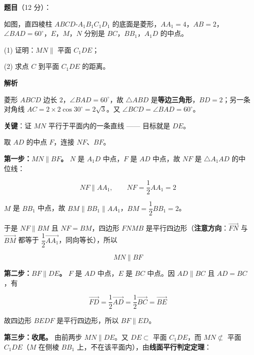 \begin{answer}

\textbf{题目}（12 分）：

如图，直四棱柱 $ABCD\text{-}A_1B_1C_1D_1$ 的底面是菱形，$AA_1=4$，$AB=2$，$\angle BAD=60^\circ$，$E$，$M$，$N$ 分别是 $BC$，$BB_1$，$A_1D$ 的中点。
\nopagebreak[4]
\begin{center}\end{center}
\nopagebreak[4]
  (1) 证明：$MN\parallel$ 平面 $C_1DE$；

  (2) 求点 $C$ 到平面 $C_1DE$ 的距离。

\textbf{解析}


菱形 $ABCD$ 边长 $2$，$\angle BAD=60^\circ$，故 $\triangle ABD$ 是\textbf{等边三角形}，$BD=2$；另一条对角线 $AC=2\times2\cos30^\circ=2\sqrt3$。又 $\angle BCD=\angle BAD=60^\circ$。


\textbf{关键}：证 $MN$ 平行于平面内的一条直线 —— 目标就是 $DE$。

取 $AD$ 的中点 $F$，连接 $NF$、$BF$。

\textbf{第一步：$MN\parallel BF$。}
$N$ 是 $A_1D$ 中点，$F$ 是 $AD$ 中点，故 $NF$ 是 $\triangle A_1AD$ 的中位线：

\nopagebreak[4]
\[NF\parallel AA_1,\qquad NF=\frac12AA_1=2\]

$M$ 是 $BB_1$ 中点，故 $BM\parallel BB_1\parallel AA_1$，$BM=\dfrac12BB_1=2$。

于是 $NF\parallel BM$ 且 $NF=BM$，四边形 $FNMB$ 是平行四边形（\textbf{注意方向}：$\overrightarrow{FN}$ 与 $\overrightarrow{BM}$ 都等于 $\dfrac12\overrightarrow{AA_1}$，同向等长），所以

\nopagebreak[4]
\[MN\parallel BF\]

\textbf{第二步：$BF\parallel DE$。}
$F$ 是 $AD$ 中点，$E$ 是 $BC$ 中点。因 $AD\parallel BC$ 且 $AD=BC$，有

\nopagebreak[4]
\[\overrightarrow{FD}=\frac12\overrightarrow{AD}=\frac12\overrightarrow{BC}=\overrightarrow{BE}\]

故四边形 $BEDF$ 是平行四边形，所以 $BF\parallel ED$。

\textbf{第三步：收尾。}
由前两步 $MN\parallel DE$。又 $DE\subset$ 平面 $C_1DE$，而 $MN\not\subset$ 平面 $C_1DE$（$M$ 在侧棱 $BB_1$ 上，不在该平面内），由\textbf{线面平行判定定理}：


\end{answer}
